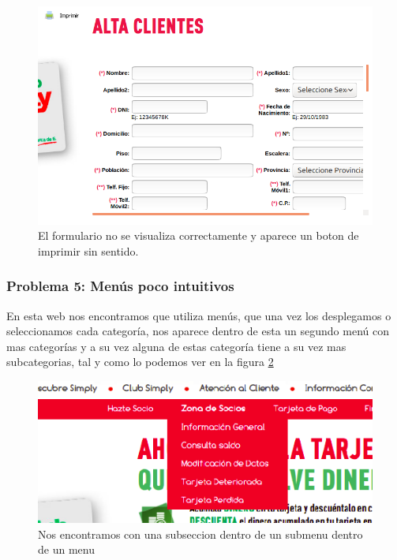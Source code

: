 \documentclass[a4paper,11pt]{article}
\begin{document}
\begin{figure}[h!]
 \centering
 \includegraphics[scale=0.5]{imprimiryformulario.png}
 \caption{El formulario no se visualiza correctamente y aparece un boton de imprimir sin sentido.}
 \label{fig:imprimiryformulario}
\end{figure}



\subsubsection{Problema 5: Menús poco intuitivos}
En esta web nos encontramos que utiliza menús, que una vez los desplegamos o seleccionamos cada categoría, nos aparece dentro de esta un segundo menú con mas categorías y a su vez alguna de estas categoría tiene a su vez mas subcategorias, tal y como lo podemos ver en la figura \ref{fig:subsubmenu}

\begin{figure}[h!]
 \centering
 \includegraphics[scale=0.5]{subsubmenu.png}
 \caption{Nos encontramos con una subseccion dentro de un submenu dentro de un menu}
 \label{fig:subsubmenu}
\end{figure}
\end{document}
